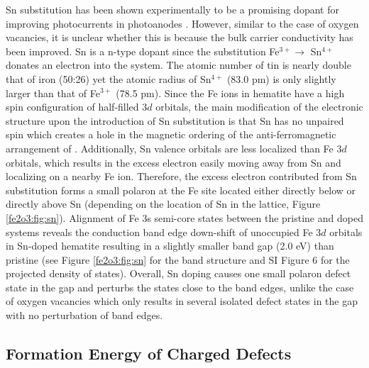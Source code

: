 Sn substitution has been shown experimentally to be a promising dopant for improving photocurrents in  photoanodes \cite{ling2011sn}. However, similar to the case of oxygen vacancies, it is unclear whether this is because the bulk carrier conductivity has been improved. Sn is a n-type dopant since the substitution Fe$^{3+}\rightarrow$ Sn$^{4+}$ donates an electron into the system. The atomic number of tin is nearly double that of iron (50:26) yet the atomic radius of Sn$^{4+}$ (83.0 pm) is only slightly larger than that of Fe$^{3+}$ (78.5 pm). Since the Fe ions in hematite have a high spin configuration of half-filled $3d$ orbitals, the main modification of the electronic structure upon the introduction of Sn substitution is that Sn has no unpaired spin which creates a hole in the magnetic ordering of the anti-ferromagnetic arrangement of . Additionally, Sn valence orbitals are less localized than Fe $3d$ orbitals, which results in the excess electron easily moving away from Sn and localizing on a nearby Fe ion. Therefore, the excess electron contributed from Sn substitution forms a small polaron at the Fe site located either directly below or directly above Sn (depending on the location of Sn in the lattice, Figure \ref{fe2o3:fig:sn}). Alignment of Fe 3s semi-core states between the pristine and doped systems reveals the conduction band edge down-shift of unoccupied Fe $3d$ orbitals in Sn-doped hematite resulting in a slightly smaller band gap (2.0 eV) than pristine  (see Figure \ref{fe2o3:fig:sn} for the band structure and SI Figure 6 for the projected density of states). Overall, Sn doping causes one small polaron defect state in the gap and perturbs the states close to the band edges, unlike the case of oxygen vacancies which only results in several isolated defect states in the gap with no perturbation of band edges.


\subsection{Formation Energy of Charged Defects}


